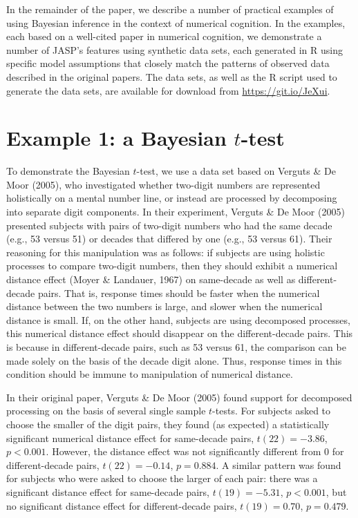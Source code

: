 \documentclass[english,,doc,floatsintext]{apa6}
\begin{document}
In the remainder of the paper, we describe a number of practical examples of using Bayesian inference in the context of numerical cognition. In the examples, each based on a well-cited paper in numerical cognition, we demonstrate a number of JASP's features using synthetic data sets, each generated in R using specific model assumptions that closely match the patterns of observed data described in the original papers. The data sets, as well as the R script used to generate the data sets, are available for download from \url{https://git.io/JeXui}.

\hypertarget{example-1-a-bayesian-t-test}{%
\section{\texorpdfstring{Example 1: a Bayesian \(t\)-test}{Example 1: a Bayesian t-test}}\label{example-1-a-bayesian-t-test}}

To demonstrate the Bayesian \(t\)-test, we use a data set based on Verguts \& De Moor (2005), who investigated whether two-digit numbers are represented holistically on a mental number line, or instead are processed by decomposing into separate digit components. In their experiment, Verguts \& De Moor (2005) presented subjects with pairs of two-digit numbers who had the same decade (e.g., 53 versus 51) or decades that differed by one (e.g., 53 versus 61). Their reasoning for this manipulation was as follows: if subjects are using holistic processes to compare two-digit numbers, then they should exhibit a numerical distance effect (Moyer \& Landauer, 1967) on same-decade as well as different-decade pairs. That is, response times should be faster when the numerical distance between the two numbers is large, and slower when the numerical distance is small. If, on the other hand, subjects are using decomposed processes, this numerical distance effect should disappear on the different-decade pairs. This is because in different-decade pairs, such as 53 versus 61, the comparison can be made solely on the basis of the decade digit alone. Thus, response times in this condition should be immune to manipulation of numerical distance.

In their original paper, Verguts \& De Moor (2005) found support for decomposed processing on the basis of several single sample \(t\)-tests. For subjects asked to choose the smaller of the digit pairs, they found (as expected) a statistically significant numerical distance effect for same-decade pairs, \(t(22) = -3.86\), \(p<0.001\). However, the distance effect was not significantly different from 0 for different-decade pairs, \(t(22)=-0.14\), \(p=0.884\). A similar pattern was found for subjects who were asked to choose the larger of each pair: there was a significant distance effect for same-decade pairs, \(t(19)=-5.31\), \(p<0.001\), but no significant distance effect for different-decade pairs, \(t(19)=0.70\), \(p=0.479\).
\end{document}
